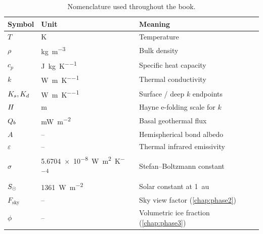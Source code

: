\begin{table}[H]
\centering
\small
\begin{tabularx}{\linewidth}{l l Y}
\toprule
Symbol & Unit & Meaning \\
\midrule
$T$        & K         & Temperature \\
$\rho$     & \si{\kilogram\per\meter\cubed} & Bulk density \\
$c_p$      & \si{\joule\per\kilogram\per\kelvin} & Specific heat capacity \\
$k$        & \si{\watt\per\meter\per\kelvin} & Thermal conductivity \\
$K_{s},K_{d}$ & \si{\watt\per\meter\per\kelvin} & Surface / deep $k$ endpoints \\
$H$  & \si{\meter} & Hayne e-folding scale for $k$ \\
$Q_{b}$      & \si{\milli\watt\per\meter\squared} & Basal geothermal flux \\
$A$        & --        & Hemispherical bond albedo \\
$\varepsilon$ & --     & Thermal infrared emissivity \\
$\sigma$   & \SI{5.6704e-8}{\watt\per\meter\squared\per\kelvin\tothe{4}} & Stefan--Boltzmann constant \\
$S_{\odot}$  & \SI{1361}{\watt\per\meter\squared} & Solar constant at \SI{1}{au} \\
$F_{\mathrm{sky}}$ & --  & Sky view factor (\cref{chap:phase2}) \\
$\phi$     & --        & Volumetric ice fraction (\cref{chap:phase3}) \\
\bottomrule
\end{tabularx}
\caption{Nomenclature used throughout the book.}
\label{tab:symbols}
\end{table}
